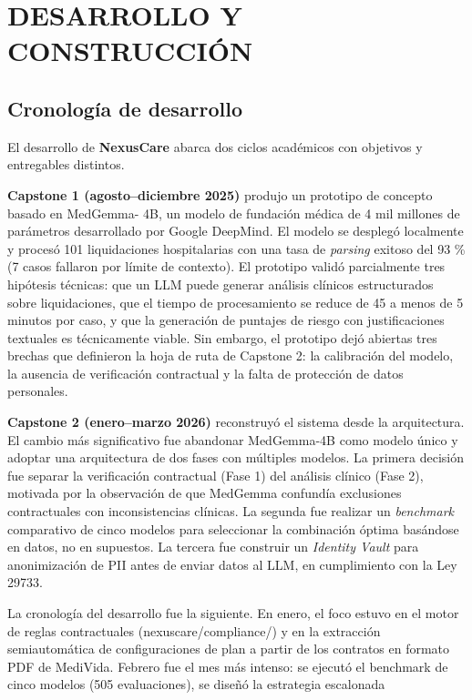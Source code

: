 \chapter{DESARROLLO Y CONSTRUCCIÓN}

\section{Cronología de desarrollo}

El desarrollo de \textbf{NexusCare} abarca dos ciclos académicos con objetivos y entregables distintos.

\textbf{Capstone 1 (agosto–diciembre 2025)} produjo un prototipo de concepto basado en MedGemma- 4B, un modelo de fundación médica de 4 mil millones de parámetros desarrollado por Google DeepMind. El modelo se desplegó localmente y procesó 101 liquidaciones hospitalarias con una tasa de \textit{parsing} exitoso del 93 \% (7 casos fallaron por límite de contexto). El prototipo validó parcialmente tres hipótesis técnicas: que un LLM puede generar análisis clínicos estructurados sobre liquidaciones, que el tiempo de procesamiento se reduce de 45 a menos de 5 minutos por caso, y que la generación de puntajes de riesgo con justificaciones textuales es técnicamente viable. Sin embargo, el prototipo dejó abiertas tres brechas que definieron la hoja de ruta de Capstone 2: la calibración del modelo, la ausencia de verificación contractual y la falta de protección de datos personales.

\textbf{Capstone 2 (enero–marzo 2026)} reconstruyó el sistema desde la arquitectura. El cambio más significativo fue abandonar MedGemma-4B como modelo único y adoptar una arquitectura de dos fases con múltiples modelos. La primera decisión fue separar la verificación contractual (Fase 1) del análisis clínico (Fase 2), motivada por la observación de que MedGemma confundía exclusiones contractuales con inconsistencias clínicas. La segunda fue realizar un \textit{benchmark} comparativo de cinco modelos para seleccionar la combinación óptima basándose en datos, no en supuestos. La tercera fue construir un \textit{Identity Vault} para anonimización de PII antes de enviar datos al LLM, en cumplimiento con la Ley 29733.

La cronología del desarrollo fue la siguiente. En enero, el foco estuvo en el motor de reglas contractuales (nexuscare/compliance/) y en la extracción semiautomática de configuraciones de plan a partir de los contratos en formato PDF de MediVida. Febrero fue el mes más intenso: se ejecutó el benchmark de cinco modelos (505 evaluaciones), se diseñó la estrategia escalonada

